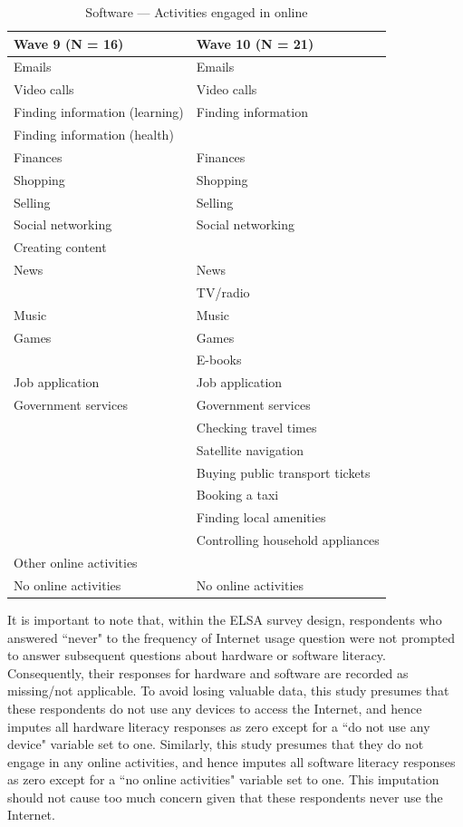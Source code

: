 \begin{table}[h!]
    \centering
    \caption{Software --- Activities engaged in online}
    \label{tab:software}
    \begin{tabular}{ll}
        \toprule
        Wave 9 (N = 16) & Wave 10 (N = 21) \\
        \midrule
        Emails & Emails \\
        Video calls & Video calls \\
        Finding information (learning) & Finding information \\
        Finding information (health) & \\
        Finances & Finances \\
        Shopping & Shopping \\
        Selling & Selling \\
        Social networking & Social networking \\
        Creating content & \\
        News & News \\
         & TV/radio \\
        Music & Music \\
        Games & Games \\
         & E-books \\
        Job application & Job application \\
        Government services & Government services \\
         & Checking travel times \\
         & Satellite navigation \\
         & Buying public transport tickets \\
         & Booking a taxi \\
         & Finding local amenities \\
         & Controlling household appliances \\
        Other online activities & \\
        No online activities & No online activities \\
        \bottomrule
    \end{tabular}
\end{table}

It is important to note that, within the ELSA survey design, respondents who answered ``never" to the frequency of Internet usage question were not prompted to answer subsequent questions about hardware or software literacy. Consequently, their responses for hardware and software are recorded as missing/not applicable. To avoid losing valuable data, this study presumes that these respondents do not use any devices to access the Internet, and hence imputes all hardware literacy responses as zero except for a ``do not use any device" variable set to one. Similarly, this study presumes that they do not engage in any online activities, and hence imputes all software literacy responses as zero except for a ``no online activities" variable set to one. This imputation should not cause too much concern given that these respondents never use the Internet.

